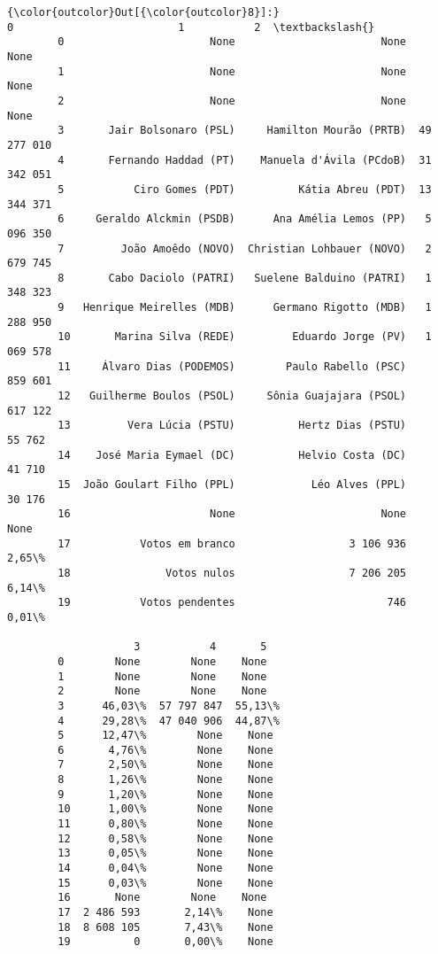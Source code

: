 \documentclass[11pt]{article}
\begin{document}
\begin{Verbatim}[commandchars=\\\{\}]
{\color{outcolor}Out[{\color{outcolor}8}]:}                            0                          1           2  \textbackslash{}
        0                       None                       None        None   
        1                       None                       None        None   
        2                       None                       None        None   
        3       Jair Bolsonaro (PSL)     Hamilton Mourão (PRTB)  49 277 010   
        4       Fernando Haddad (PT)    Manuela d'Ávila (PCdoB)  31 342 051   
        5           Ciro Gomes (PDT)          Kátia Abreu (PDT)  13 344 371   
        6     Geraldo Alckmin (PSDB)      Ana Amélia Lemos (PP)   5 096 350   
        7         João Amoêdo (NOVO)  Christian Lohbauer (NOVO)   2 679 745   
        8       Cabo Daciolo (PATRI)   Suelene Balduino (PATRI)   1 348 323   
        9   Henrique Meirelles (MDB)      Germano Rigotto (MDB)   1 288 950   
        10       Marina Silva (REDE)         Eduardo Jorge (PV)   1 069 578   
        11     Álvaro Dias (PODEMOS)        Paulo Rabello (PSC)     859 601   
        12   Guilherme Boulos (PSOL)     Sônia Guajajara (PSOL)     617 122   
        13         Vera Lúcia (PSTU)          Hertz Dias (PSTU)      55 762   
        14    José Maria Eymael (DC)          Helvio Costa (DC)      41 710   
        15  João Goulart Filho (PPL)            Léo Alves (PPL)      30 176   
        16                      None                       None        None   
        17           Votos em branco                  3 106 936       2,65\%   
        18               Votos nulos                  7 206 205       6,14\%   
        19           Votos pendentes                        746       0,01\%   
        
                    3           4       5  
        0        None        None    None  
        1        None        None    None  
        2        None        None    None  
        3      46,03\%  57 797 847  55,13\%  
        4      29,28\%  47 040 906  44,87\%  
        5      12,47\%        None    None  
        6       4,76\%        None    None  
        7       2,50\%        None    None  
        8       1,26\%        None    None  
        9       1,20\%        None    None  
        10      1,00\%        None    None  
        11      0,80\%        None    None  
        12      0,58\%        None    None  
        13      0,05\%        None    None  
        14      0,04\%        None    None  
        15      0,03\%        None    None  
        16       None        None    None  
        17  2 486 593       2,14\%    None  
        18  8 608 105       7,43\%    None  
        19          0       0,00\%    None  
\end{Verbatim}
            
\end{document}
